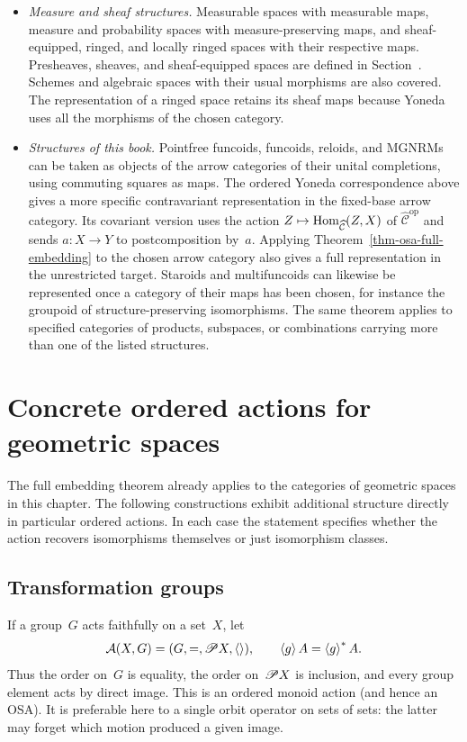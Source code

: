 \begin{itemize}
required, including for lines. Manifolds with continuous or smooth
maps give further categories.
\item \emph{Measure and sheaf structures.}
Measurable spaces with measurable maps, measure and probability
spaces with measure-preserving maps, and sheaf-equipped, ringed,
and locally ringed spaces with their respective maps.  Presheaves,
sheaves, and sheaf-equipped spaces are defined in
Section~. Schemes and
algebraic spaces with their usual morphisms are also covered. The
representation of a ringed space retains its sheaf maps because
Yoneda uses all the morphisms of the chosen category.
\item \emph{Structures of this book.}
Pointfree funcoids, funcoids, reloids, and MGNRMs can be taken as objects
of the arrow categories of their unital completions, using commuting
squares as maps. The ordered Yoneda correspondence above gives a
more specific contravariant representation in the fixed-base arrow
category. Its covariant version uses the action
$Z\mapsto\operatorname{Hom}_{\widehat{\mathcal C}}(Z,X)$ of
$\widehat{\mathcal C}^{\mathrm{op}}$ and sends $a:X\to Y$ to
postcomposition by~$a$. Applying
Theorem~\ref{thm-osa-full-embedding} to the chosen arrow category also
gives a full representation in the unrestricted target. Staroids
and multifuncoids can likewise be represented once a category of
their maps has been chosen, for instance the groupoid of
structure-preserving isomorphisms. The same theorem applies to
specified categories of products, subspaces, or combinations carrying
more than one of the listed structures.
\end{itemize}

\chapter{Concrete ordered actions for geometric spaces}

The full embedding theorem already applies to the categories of
geometric spaces in this chapter. The following constructions exhibit
additional structure directly in particular ordered actions. In each
case the statement specifies whether the action recovers isomorphisms
themselves or just isomorphism classes.

\section{Transformation groups}

If a group~$G$ acts faithfully on a set~$X$, let
\[
 \mathcal A(X,G)=(G,=,\mathscr{P} X,\left\langle \right\rangle),\qquad
 \left\langle g\right\rangle A=\left\langle g\right\rangle ^{\ast}A.
\]
Thus the order on~$G$ is equality, the order on~$\mathscr{P} X$ is inclusion,
and every group element acts by direct image.  This is an ordered monoid
action (and hence an OSA).  It is preferable here to a single orbit
operator on sets of sets: the latter may forget which motion produced a
given image.


